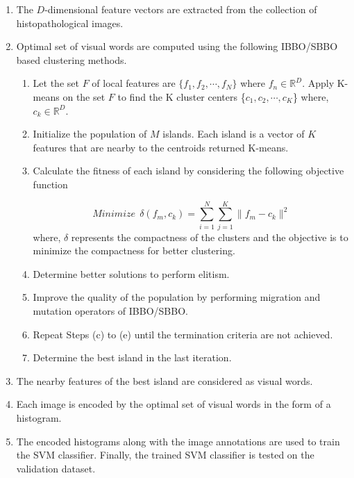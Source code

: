 \begin{enumerate}
\item  The $D$-dimensional feature vectors are extracted from the collection of histopathological images.

\item Optimal  set of visual words are computed using the following IBBO/SBBO based clustering methods.
\begin{enumerate}
\item Let the set $F$ of local features are $\{f_1, f_2, \cdots, f_N\}$ where $f_n \in \mathbb{R}^D$. Apply K-means on the set $F$ to find the K cluster centers \{$c_1, c_2, \cdots, c_K$\} where, $c_k \in \mathbb{R}^D$. 

\item Initialize the population of $M$ islands. Each island is a vector of  $K$ features that are nearby to the centroids returned K-means.  

\item Calculate the fitness of each island by considering the following objective function

\begin{equation}\label{eq:fitness} 
Minimize  \ \ \delta(f_m, c_k)   =  \sum_{i=1}^N \sum_{j=1}^K \parallel f_m - c_k \parallel ^2
\end{equation}
 where, $\delta$ represents the compactness of the clusters and the objective is to minimize the compactness for better clustering.
 
 \item Determine better solutions to perform elitism. 

\item Improve the quality of the population by performing migration and mutation operators of IBBO/SBBO.

\item Repeat Steps (c) to (e) until the termination criteria are not achieved.

\item Determine the best island in the last iteration.

\end{enumerate}

\item The nearby features of the best island are considered as visual words.

\item Each image is encoded by the optimal set of visual words in the form of a histogram.

\item The encoded histograms along with the image annotations are used to train the SVM classifier. Finally, the trained SVM classifier is tested on the validation dataset.  

\end{enumerate}




